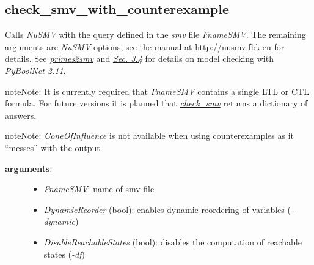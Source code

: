\documentclass[letterpaper,10pt,english]{sphinxmanual}
\begin{document}
\subsection{check\_smv\_with\_counterexample}
\label{ModelChecking:id5}\label{ModelChecking:check-smv-with-counterexample}

\begin{fulllineitems}
\label{ModelChecking:PyBoolNet.ModelChecking.check_smv_with_counterexample}
Calls {\hyperref[Installation:installation-nusmv]{\emph{NuSMV}}} with the query defined in the \emph{smv} file \emph{FnameSMV}.
The remaining arguments are {\hyperref[Installation:installation-nusmv]{\emph{NuSMV}}} options, see the manual at \href{http://nusmv.fbk.eu}{http://nusmv.fbk.eu} for details.
See {\hyperref[ModelChecking:primes2smv]{\emph{primes2smv}}} and {\hyperref[Manual:sec-model-checking]{\emph{Sec. 3.4}}} for details on model checking with \emph{PyBoolNet 2.11}.

\begin{notice}{note}{Note:}
It is currently required that \emph{FnameSMV} contains a single LTL or CTL formula.
For future versions it is planned that {\hyperref[ModelChecking:check-smv]{\emph{check\_smv}}} returns a dictionary of answers.
\end{notice}

\begin{notice}{note}{Note:}
\emph{ConeOfInfluence} is not available when using counterexamples as it ``messes'' with the output.
\end{notice}
\begin{description}
\item[{\textbf{arguments}:}] \leavevmode\begin{itemize}
\item {} 
\emph{FnameSMV}: name of smv file

\item {} 
\emph{DynamicReorder} (bool): enables dynamic reordering of variables (\emph{-dynamic})

\item {} 
\emph{DisableReachableStates} (bool): disables the computation of reachable states (\emph{-df})

\end{itemize}


\end{description}
\end{fulllineitems}
\end{document}

